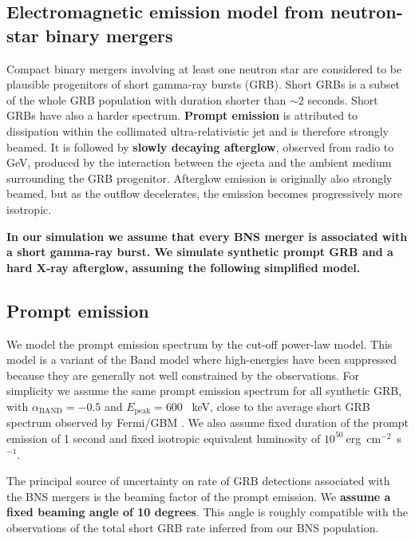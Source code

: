 \documentclass[a0,portrait]{a0poster}
\renewcommand{\emph}[1]{\textbf{\color{blue}#1}}
\newcommand{\ECM}[1] {\textbf{\textcolor{magenta}{#1}}}
\begin{document}
\begin{multicols}{2}
\section*{Electromagnetic emission model from neutron-star binary mergers}

Compact binary mergers involving at least one neutron star are considered to be
plausible progenitors of short gamma-ray bursts (GRB). Short GRBs is a
subset of the whole GRB population with duration shorter than $\sim$2
seconds. Short GRBs have also a harder spectrum. \emph{Prompt emission} is attributed
to dissipation within the collimated ultra-relativistic jet and is therefore
strongly beamed. It is followed by \emph{slowly decaying afterglow}, observed from
radio to GeV, produced by the interaction between the ejecta and the ambient
medium surrounding the GRB progenitor. Afterglow emission is originally also
strongly beamed, but as the outflow decelerates, the emission becomes
progressively more isotropic.

\emph{In our simulation we assume that every BNS merger is associated with a short
gamma-ray burst. We simulate synthetic prompt GRB and a hard X-ray afterglow,
assuming the following simplified model.}

\subsection*{Prompt emission}
We model the prompt emission spectrum by the cut-off power-law model. This
model is a variant of the Band model \cite{band93} where high-energies have
been suppressed because they are generally not well constrained by the
observations. For simplicity we assume the same prompt emission spectrum
for all synthetic GRB, with $\alpha_{\mathrm{BAND}} = - 0.5$ and
$E_{\mathrm{peak}} = 600$ \, keV, close to the average short GRB spectrum
observed by Fermi/GBM \cite{gruber14}.  
We also assume
fixed duration of the prompt emission of 1 second and fixed isotropic equivalent
luminosity of $10^{50}~$erg~cm$^{-2}$~s$^{-1}$.

The principal source of uncertainty on rate of GRB detections associated with
the BNS mergers is the beaming factor of the prompt emission. We \emph{assume a fixed
beaming angle of 10 degrees}. This angle is roughly compatible with the
observations of the total short GRB rate inferred from our BNS population.


\end{multicols}
\end{document}
